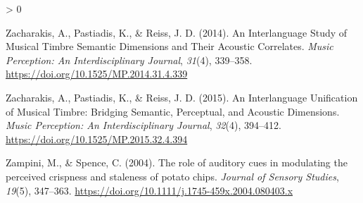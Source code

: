 \documentclass[
  english,
  man,floatsintext]{apa6}
\newlength{\cslhangindent}
\newenvironment{CSLReferences}[2] %
 {%
  \setlength{\parindent}{0pt}
  \ifodd #1 \everypar{\setlength{\hangindent}{\cslhangindent}}\ignorespaces\fi
  \ifnum #2 > 0
  \setlength{\parskip}{#2\baselineskip}
  \fi
 }%
 {}
\begin{document}
\begin{CSLReferences}{1}{0}
\leavevmode\hypertarget{ref-Zacharakis2014}{}%
Zacharakis, A., Pastiadis, K., \& Reiss, J. D. (2014). {An Interlanguage Study of Musical Timbre Semantic Dimensions and Their Acoustic Correlates}. \emph{Music Perception: An Interdisciplinary Journal}, \emph{31}(4), 339--358. \url{https://doi.org/10.1525/MP.2014.31.4.339}

\leavevmode\hypertarget{ref-Zacharakis2015}{}%
Zacharakis, A., Pastiadis, K., \& Reiss, J. D. (2015). {An Interlanguage Unification of Musical Timbre: Bridging Semantic, Perceptual, and Acoustic Dimensions}. \emph{Music Perception: An Interdisciplinary Journal}, \emph{32}(4), 394--412. \url{https://doi.org/10.1525/MP.2015.32.4.394}

\leavevmode\hypertarget{ref-Zampini2004}{}%
Zampini, M., \& Spence, C. (2004). {The role of auditory cues in modulating the perceived crispness and staleness of potato chips}. \emph{Journal of Sensory Studies}, \emph{19}(5), 347--363. \url{https://doi.org/10.1111/j.1745-459x.2004.080403.x}

\end{CSLReferences}

\endgroup
\end{document}
